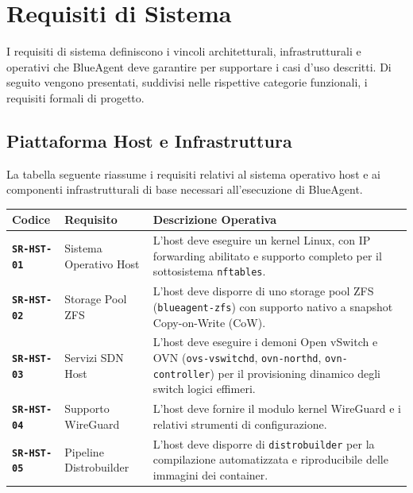 \section{Requisiti di Sistema}\label{requisiti-di-sistema}

I requisiti di sistema definiscono i vincoli architetturali,
infrastrutturali e operativi che BlueAgent deve garantire per supportare
i casi d'uso descritti. Di seguito vengono presentati, suddivisi nelle
rispettive categorie funzionali, i requisiti formali di progetto.

\subsection{Piattaforma Host e
Infrastruttura}\label{piattaforma-host-e-infrastruttura}

La tabella seguente riassume i requisiti relativi al sistema operativo
host e ai componenti infrastrutturali di base necessari all'esecuzione
di BlueAgent.

\begin{longtable}[]{@{}
  >{\raggedright\arraybackslash}p{}
  >{\raggedright\arraybackslash}p{}
  >{\raggedright\arraybackslash}p{}@{}}
\toprule\noalign{}
\begin{minipage}[b]{\linewidth}\raggedright
Codice
\end{minipage} & \begin{minipage}[b]{\linewidth}\raggedright
Requisito
\end{minipage} & \begin{minipage}[b]{\linewidth}\raggedright
Descrizione Operativa
\end{minipage} \\
\midrule\noalign{}
\endhead
\bottomrule\noalign{}
\endlastfoot
\textbf{\passthrough{\lstinline!SR-HST-01!}} & Sistema Operativo Host &
L'host deve eseguire un kernel Linux, con IP forwarding abilitato e
supporto completo per il sottosistema
\passthrough{\lstinline!nftables!}. \\
\textbf{\passthrough{\lstinline!SR-HST-02!}} & Storage Pool ZFS & L'host
deve disporre di uno storage pool ZFS
(\passthrough{\lstinline!blueagent-zfs!}) con supporto nativo a snapshot
Copy-on-Write (CoW). \\
\textbf{\passthrough{\lstinline!SR-HST-03!}} & Servizi SDN Host & L'host
deve eseguire i demoni Open vSwitch e OVN
(\passthrough{\lstinline!ovs-vswitchd!},
\passthrough{\lstinline!ovn-northd!},
\passthrough{\lstinline!ovn-controller!}) per il provisioning dinamico
degli switch logici effimeri. \\
\textbf{\passthrough{\lstinline!SR-HST-04!}} & Supporto WireGuard &
L'host deve fornire il modulo kernel WireGuard e i relativi strumenti di
configurazione. \\
\textbf{\passthrough{\lstinline!SR-HST-05!}} & Pipeline Distrobuilder &
L'host deve disporre di \passthrough{\lstinline!distrobuilder!} per la
compilazione automatizzata e riproducibile delle immagini dei
container. \\
\end{longtable}


